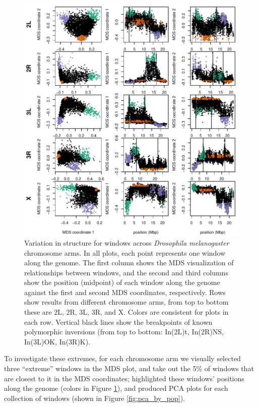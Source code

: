 \documentclass[11pt, oneside]{article}   	%
\begin{document}
\begin{figure}
    \begin{center}
       \includegraphics{Fig1_allchr_Together_MDS_plot_compact}
    \end{center}
    \caption{
        Variation in structure for windows across \textit{Drosophila melanogaster} chromosome arms.
        In all plots, each point represents one window along the genome.
         The first column shows the MDS visualization of relationships between windows,
         and the second and third columns show the position (midpoint) of each window along the genome
         against the first and second MDS coordinates, respectively. 
         Rows show results from different chromosome arms, from top to bottom these are 2L, 2R, 3L, 3R, and X. 
         Colors are consistent for plots in each row. 
         Vertical black lines show the breakpoints of known polymorphic inversions
         (from top to bottom: In(2L)t, In(2R)NS, In(3L)OK, In(3R)K).
         \label{fig:mds_chr2L}
    }
\end{figure}


To investigate these extremes, for each chromosome arm we visually selected three ``extreme'' windows in the MDS plot,
and take out the 5\% of windows that are closest to it in the MDS coordinates;
highlighted these windows' positions along the genome (colors in Figure \ref{fig:mds_chr2L}),
and produced PCA plots for each collection of windows
(shown in Figure \ref{fig:pca_by_pop}).
\end{document}
